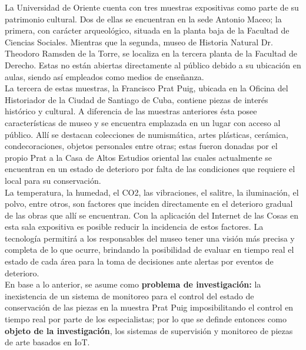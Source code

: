     La Universidad de Oriente cuenta con tres muestras expositivas como parte de su patrimonio cultural. Dos de ellas se encuentran en la sede Antonio Maceo; la primera, con carácter arqueológico, situada en la planta baja de la Facultad de Ciencias Sociales. Mientras que la segunda, museo de Historia Natural Dr. Theodoro Ramsden de la Torre, se localiza en la tercera planta de la Facultad de Derecho. Estas no están abiertas directamente al público debido a su ubicación en aulas, siendo así empleados como medios de enseñanza.\\ 
    
    La tercera de estas muestras, la Francisco Prat Puig, ubicada en la Oficina del Historiador de la Ciudad de Santiago de Cuba, contiene piezas de interés histórico y cultural. A diferencia de las muestras anteriores ésta posee características de museo y se encuentra emplazada en un lugar con acceso al público. Allí se destacan colecciones de numismática, artes plásticas, cerámica, condecoraciones, objetos personales entre otras; estas fueron donadas por el propio Prat a la Casa de Altos Estudios oriental las cuales actualmente se encuentran en un estado de deterioro por falta de las condiciones que requiere el local para su conservación.\\
    
    La temperatura, la humedad, el CO2, las vibraciones, el salitre, la iluminación, el polvo, entre otros, son factores que inciden directamente en el deterioro gradual de las obras que allí se encuentran. Con la aplicación del Internet de las Cosas en esta sala expositiva es posible reducir la incidencia de estos factores. La tecnología permitirá a los responsables del museo tener una visión más precisa y completa de lo que ocurre, brindando la posibilidad de evaluar en tiempo real el estado de cada área para la toma de decisiones ante alertas por eventos de deterioro.\\

    En base a lo anterior, se asume como \textbf{problema de investigación: }la inexistencia de un sistema de monitoreo para el control del estado de conservación de las piezas en la muestra Prat Puig imposibilitando el control en tiempo real por parte de los especialistas; por lo que se definde entonces como \textbf{objeto de la investigación}, los sistemas de supervisión y monitoreo de piezas de arte basados en IoT.\\\\\\
    
